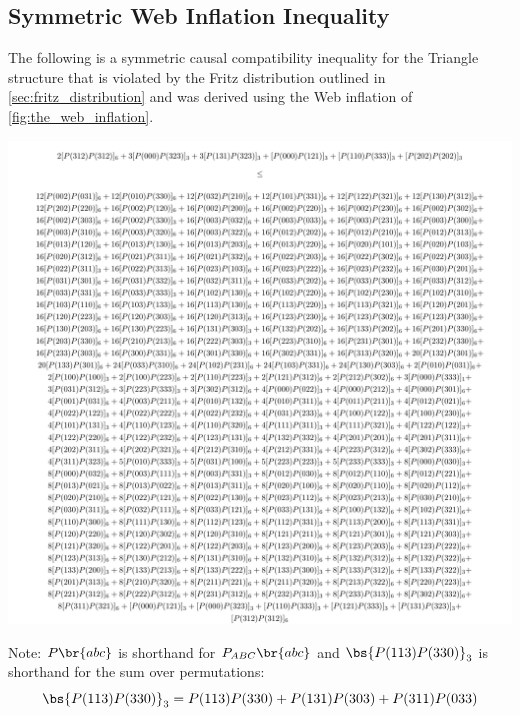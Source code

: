 \documentclass[aps, 10pt, english, twoside, pra, nofootinbib, tightenlines, longbibliography, superscriptaddress]{revtex4-1}
\begin{document}
    \subsection{Symmetric Web Inflation Inequality}
    \label{sec:symmetic_web_inequality}
    The following is a symmetric causal compatibility inequality for the Triangle structure that is violated by the Fritz distribution outlined in \cref{sec:fritz_distribution} and was derived using the Web inflation of \cref{fig:the_web_inflation}.
    \begin{center}
        \vspace{-0.2in}
        \includegraphics[width=\linewidth]{../../figures/inequalities/MosekCertFritzSym_ineq_standalone}
    \end{center}
    Note: $\prob\br{abc}$ is shorthand for $\prob[ABC]\br{abc}$ and $\bs{P(113)P(330)}_3$ is shorthand for the sum over permutations:
    \[ \bs{P(113)P(330)}_3 = P(113)P(330) + P(131)P(303) + P(311)P(033) \]

    \clearpage
    \setlength{\bibsep}{3pt plus 3pt minus 2pt}
    
    \nocite{apsrev41Control}
    
\end{document}
